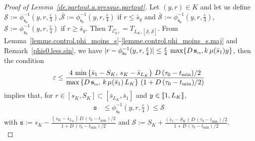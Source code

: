 \documentclass[AHL,Unicode,longabstracts,published]{cedram}
\newcommand{\llbracket}{\mathopen{[\mkern -2.7mu[}}
\newcommand{\rrbracket}{\mathclose{]\mkern -2.7mu]}}
\newcommand{\clE}{\mathcal{E}}
\newcommand{\clS}{\mathcal{S}}
\newcommand{\Sin}{{\mathbf s}_{\textrm{\tiny\rm in}}}
\newcommand{\Smin}{\underline{\mathcal{S}}}
\newcommand{\Smax}{\bar{\mathcal{S}}}
\newcommand{\SminK}{s_K}
\newcommand{\SmaxK}{S_K}
\newcommand{\barmu}{\mu(\bar s_1)}
\newcommand{\phis}{\phi_{\textsf{s}_0}^{-1}}
\newcommand{\lmax}{{L_K}}
\newcommand{\setunlmax}{\llbracket 1, \lmax\rrbracket}
\newcommand{\1}{\mathbf{1}}
\begin{document}
\begin{proof}[Proof of Lemma~\ref{de.partout.a.presque.partout}]
Let $(y,r)\in K$ and let us define $\Smin:=\phis(y,r,\frac{\varepsilon}{3})$,\linebreak $\Smax:=\phis(y,r,\frac{\varepsilon}{4})$ if $r\leq \bar s_y$ and $\Smax:= \phis(y,r,\frac{\varepsilon}{3})$, $\Smin:= \phis(y,r,\frac{\varepsilon}{4})$ if $r\geq \bar s_y$. Then $T_{\clE_{y,r}^\varepsilon}=T_{\lmax,[\Smin,\Smax]}$. From Lemma~\ref{lemme.control.phi_moins_s}-\ref{lemme.control.phi_moins_s.maj} and Remark~\ref{phis0.less.sin}, we have $|r-\phis(y,r,\frac{\varepsilon}{4})|\leq \frac{\varepsilon}{4}\,\max\{D\,\Sin,k\,\barmu y\}$, then the condition
\[
\varepsilon\leq\frac{4\,\min\left\{\bar s_1-\SmaxK,\, \SminK-\bar s_{\lmax}\right\}\,D\,(\tau_0-t_{\min})/2}{\max\left\{D\,\Sin,\, k\,\barmu\,\lmax\right\}\,\left(1+D\,(\tau_0-t_{\min})/2\right)}
\]
implies that, for $r\in [\SminK,\SmaxK]\subset [\bar s_\lmax,\bar s_1]$ and $y\in \setunlmax$,
\begin{align}\label{encadre.eps4}
\texttt{s} &\leq \phis\left(y,r,\frac{\varepsilon}{4}\right)
\leq \clS
\end{align}
with $\texttt{s}:=\SminK-\frac{(\SminK-\bar s_{\lmax})\,D\,(\tau_0-t_{\min})/2}{1+D\,(\tau_0-t_{\min})/2}$ and $\clS:= \SmaxK+\frac{(\bar s_1-\SmaxK)\,D\,(\tau_0-t_{\min})/2}{1+D\,(\tau_0-t_{\min})/2}$.\\


\end{proof}
\end{document}
